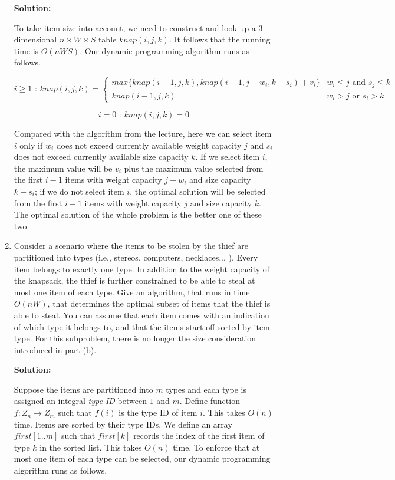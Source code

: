 \documentclass[11pt]{article}
\begin{document}
\begin{description}
\begin{enumerate}
\noindent \textbf{Solution:}

To take item size into account, we need to construct and look up a 3-dimensional $n \times W \times
S$ table $knap(i,j,k)$.  It follows that the running time is $O(nWS)$.  Our dynamic programming
algorithm runs as follows.

\[i\geq1 \textrm{  :  } knap(i,j,k)=\left\{\begin{array}{ll} max\{knap(i-1,j,k),knap(i-1,j-w_i,k-s_i)+v_i\} & w_i\leq j \textrm{ and } s_j\leq k\\

knap(i-1,j,k) & w_i>j \textrm{ or } s_i>k

\end{array}\right.\]

\[i=0 \textrm{  :  } knap(i,j,k)=0\]

Compared with the algorithm from the lecture, here we can select item $i$ only if $w_i$ does not
exceed currently available weight capacity $j$ and $s_i$ does not exceed currently available size
capacity $k$.  If we select item $i$, the maximum value will be $v_i$ plus the maximum value
selected from the first $i-1$ items with weight capacity $j-w_i$ and size capacity $k-s_i$;  if we
do not select item $i$, the optimal solution will be selected from the first $i-1$ items with
weight capacity $j$ and size capacity $k$.  The optimal solution of the whole problem is the better
one of these two.


\item Consider a scenario where the items to be stolen by the thief are partitioned into types
(i.e., stereos, computers, necklaces... ). Every item belongs to exactly one type. In addition to
the weight capacity of the knapsack, the thief is further constrained to be able to steal at most
one item of each type. Give an algorithm, that runs in time $O(nW)$, that determines the optimal
subset of items that the thief is able to steal. You can assume that each item comes with an
indication of which type it belongs to, and that the items start off sorted by item type. For this
subproblem, there is no longer the size consideration introduced in part (b).

\noindent \textbf{Solution:}

Suppose the items are partitioned into $m$ types and each type is assigned an integral \emph{type
ID} between $1$ and $m$.  Define function $f:Z_n \rightarrow Z_m$ such that $f(i)$ is the type ID
of item $i$.  This takes $O(n)$ time.  Items are sorted by their type IDs.  We define an array
$first[1..m]$ such that $first[k]$ records the index of the first item of type $k$ in the sorted
list.  This takes $O(n)$ time.  To enforce that at most one item of each type can be selected, our dynamic programming algorithm runs as follows.\\


\end{enumerate}
\end{description}
\end{document}

